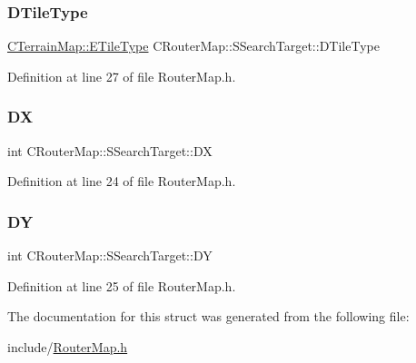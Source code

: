 \subsubsection{\texorpdfstring{D\+Tile\+Type}{DTileType}}
{\footnotesize\ttfamily \hyperlink{classCTerrainMap_aff2ab991e237269941416dd79d8871d4}{C\+Terrain\+Map\+::\+E\+Tile\+Type} C\+Router\+Map\+::\+S\+Search\+Target\+::\+D\+Tile\+Type}



Definition at line 27 of file Router\+Map.\+h.

\hypertarget{structCRouterMap_1_1SSearchTarget_a1ba72713642034425d7db39ffb2135da}{}\label{structCRouterMap_1_1SSearchTarget_a1ba72713642034425d7db39ffb2135da} 
\subsubsection{\texorpdfstring{DX}{DX}}
{\footnotesize\ttfamily int C\+Router\+Map\+::\+S\+Search\+Target\+::\+DX}



Definition at line 24 of file Router\+Map.\+h.

\hypertarget{structCRouterMap_1_1SSearchTarget_adab361d87964252b68e5b5b436d1855d}{}\label{structCRouterMap_1_1SSearchTarget_adab361d87964252b68e5b5b436d1855d} 
\subsubsection{\texorpdfstring{DY}{DY}}
{\footnotesize\ttfamily int C\+Router\+Map\+::\+S\+Search\+Target\+::\+DY}



Definition at line 25 of file Router\+Map.\+h.



The documentation for this struct was generated from the following file\+:\begin{DoxyCompactItemize}
\item 
include/\hyperlink{RouterMap_8h}{Router\+Map.\+h}\end{DoxyCompactItemize}
